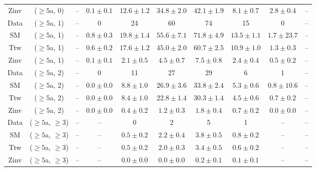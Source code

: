 \begin{table}[h!]
{\begin{tabular}{cccccccccc}
	Zinv & ($\ge5$a, 0) & -- & $0.1\pm 0.1$ & $12.6\pm 1.2$ & $34.8\pm 2.0$ & $42.1\pm 1.9$ & $8.1\pm 0.7$ & $2.8\pm 0.4$ & -- \\[0.5ex] 
	Data & ($\ge5$a, 1) & -- & 0 & 24 & 60 & 74 & 15 & 0 & -- \\[0.5ex] 
	SM & ($\ge5$a, 1) & -- & $0.8\pm 0.3$ & $19.8\pm 1.4$ & $55.6\pm 7.1$ & $71.8\pm 4.9$ & $13.5\pm 1.1$ & $1.7\pm 23.7$ & -- \\[0.5ex] 
	Ttw & ($\ge5$a, 1) & -- & $0.6\pm 0.2$ & $17.6\pm 1.2$ & $45.0\pm 2.0$ & $60.7\pm 2.5$ & $10.9\pm 1.0$ & $1.3\pm 0.3$ & -- \\[0.5ex] 
	Zinv & ($\ge5$a, 1) & -- & $0.1\pm 0.1$ & $2.1\pm 0.5$ & $4.5\pm 0.7$ & $7.5\pm 0.8$ & $2.4\pm 0.4$ & $0.5\pm 0.2$ & -- \\[0.5ex] 
	Data & ($\ge5$a, 2) & -- & 0 & 11 & 27 & 29 & 6 & 1 & -- \\[0.5ex] 
	SM & ($\ge5$a, 2) & -- & $0.0\pm 0.0$ & $8.8\pm 1.0$ & $26.9\pm 3.6$ & $33.8\pm 2.4$ & $5.3\pm 0.6$ & $0.8\pm 10.6$ & -- \\[0.5ex] 
	Ttw & ($\ge5$a, 2) & -- & $0.0\pm 0.0$ & $8.4\pm 1.0$ & $22.8\pm 1.4$ & $30.3\pm 1.4$ & $4.5\pm 0.6$ & $0.7\pm 0.2$ & -- \\[0.5ex] 
	Zinv & ($\ge5$a, 2) & -- & $0.0\pm 0.0$ & $0.4\pm 0.2$ & $1.2\pm 0.3$ & $1.8\pm 0.4$ & $0.7\pm 0.2$ & $0.0\pm 0.0$ & -- \\[0.5ex] 
	Data & ($\ge5$a, $\ge3$) & -- & -- & 0 & 2 & 5 & 1 & -- & -- \\[0.5ex] 
	SM & ($\ge5$a, $\ge3$) & -- & -- & $0.5\pm 0.2$ & $2.2\pm 0.4$ & $3.8\pm 0.5$ & $0.8\pm 0.2$ & -- & -- \\[0.5ex] 
	Ttw & ($\ge5$a, $\ge3$) & -- & -- & $0.5\pm 0.2$ & $2.0\pm 0.3$ & $3.4\pm 0.5$ & $0.6\pm 0.2$ & -- & -- \\[0.5ex] 
	Zinv & ($\ge5$a, $\ge3$) & -- & -- & $0.0\pm 0.0$ & $0.0\pm 0.0$ & $0.2\pm 0.1$ & $0.1\pm 0.1$ & -- & -- \\[0.5ex] 
	\hline
	\hline
\end{tabular}}
\end{table}
